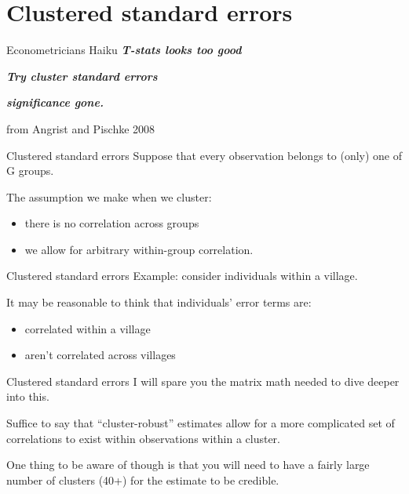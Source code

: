 \documentclass[
  ignorenonframetext,
]{beamer}
\begin{document}
\hypertarget{clustered-standard-errors}{%
\section{Clustered standard errors}\label{clustered-standard-errors}}

\begin{frame}{Econometricians Haiku}
\protect\hypertarget{econometricians-haiku}{}
\textbf{\emph{T-stats looks too good}}

\textbf{\emph{Try cluster standard errors}}

\textbf{\emph{significance gone.}}

\bigskip

\small

from Angrist and Pischke 2008
\end{frame}

\begin{frame}{Clustered standard errors}
\protect\hypertarget{clustered-standard-errors-1}{}
Suppose that every observation belongs to (only) one of G groups.

The assumption we make when we cluster:

\begin{itemize}
\item
  there is no correlation across groups
\item
  we allow for arbitrary within-group correlation.
\end{itemize}
\end{frame}

\begin{frame}{Clustered standard errors}
\protect\hypertarget{clustered-standard-errors-2}{}
Example: consider individuals within a village.

It may be reasonable to think that individuals' error terms are:

\begin{itemize}
\item
  correlated within a village
\item
  aren't correlated across villages
\end{itemize}
\end{frame}

\begin{frame}{Clustered standard errors}
\protect\hypertarget{clustered-standard-errors-3}{}
I will spare you the matrix math needed to dive deeper into this.

Suffice to say that ``cluster-robust'' estimates allow for a more
complicated set of correlations to exist within observations within a
cluster.

One thing to be aware of though is that you will need to have a fairly
large number of clusters (40+) for the estimate to be credible.
\end{frame}
\end{document}
